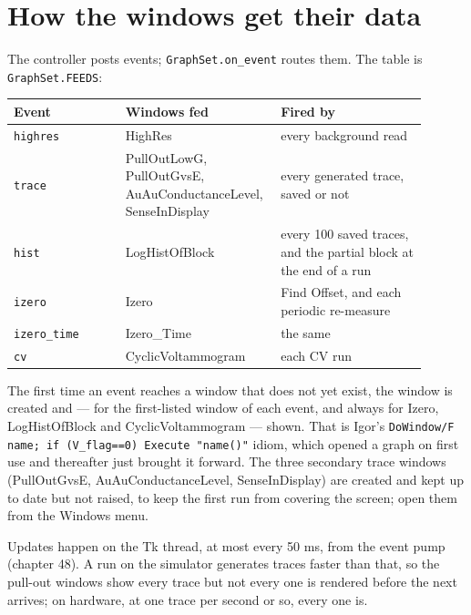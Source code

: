 \section{How the windows get their data}

The controller posts events; \texttt{Graph\discretionary{}{}{}Set.\discretionary{}{}{}on\_\discretionary{}{}{}event} routes them. The table is \texttt{Graph\discretionary{}{}{}Set.\discretionary{}{}{}FEEDS}:

\small\setlength{\LTleft}{0pt}\setlength{\LTright}{\fill}
\begin{longtable}{@{}>{\raggedright\arraybackslash}p{0.26\linewidth}>{\raggedright\arraybackslash}p{0.30\linewidth}>{\raggedright\arraybackslash}p{0.34\linewidth}@{}}
\toprule
\textbf{Event} & \textbf{Windows fed} & \textbf{Fired by} \\
\midrule\endhead
\texttt{highres} & HighRes & every background read \\
\texttt{trace} & PullOutLowG, PullOutGvsE, AuAuConductanceLevel, SenseInDisplay & every generated trace, saved or not \\
\texttt{hist} & LogHistOfBlock & every 100 saved traces, and the partial block at the end of a run \\
\texttt{izero} & Izero & Find Offset, and each periodic re-measure \\
\texttt{izero\_\discretionary{}{}{}time} & Izero\_Time & the same \\
\texttt{cv} & CyclicVoltammogram & each CV run \\
\bottomrule
\end{longtable}
\normalsize

The first time an event reaches a window that does not yet exist, the window is created and --- for the first-listed window of each event, and always for Izero, LogHistOfBlock and CyclicVoltammogram --- shown. That is Igor's \texttt{Do\discretionary{}{}{}Window/\discretionary{}{}{}F name; if (V\_\discretionary{}{}{}flag==0) Execute "name()"} idiom, which opened a graph on first use and thereafter just brought it forward. The three secondary trace windows (PullOutGvsE, AuAuConductanceLevel, SenseInDisplay) are created and kept up to date but not raised, to keep the first run from covering the screen; open them from the Windows menu.

Updates happen on the Tk thread, at most every 50 ms, from the event pump (chapter 48). A run on the simulator generates traces faster than that, so the pull-out windows show every trace but not every one is rendered before the next arrives; on hardware, at one trace per second or so, every one is.

